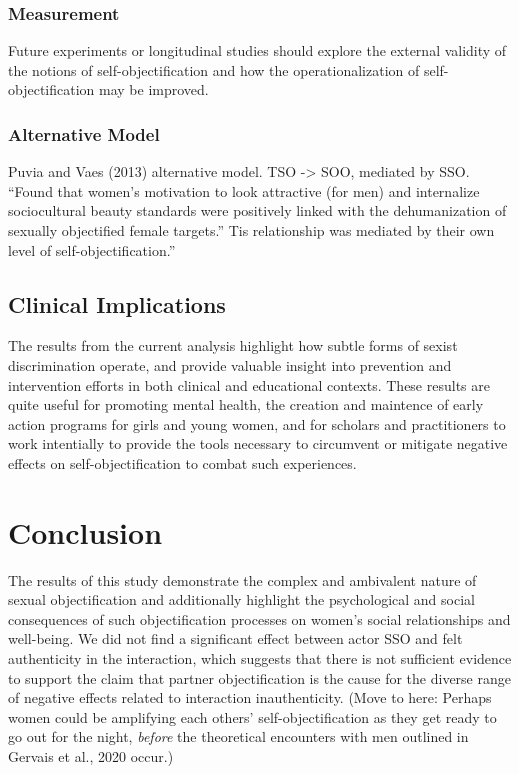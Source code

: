 \documentclass[man]{apa6}
\begin{document}
\subsubsection{Measurement}\label{measurement}

Future experiments or longitudinal studies should explore the external
validity of the notions of self-objectification and how the
operationalization of self-objectification may be improved.

\subsubsection{Alternative Model}\label{alternative-model}

Puvia and Vaes (2013) alternative model. TSO -\textgreater{} SOO,
mediated by SSO. \enquote{Found that women's motivation to look
attractive (for men) and internalize sociocultural beauty standards were
positively linked with the dehumanization of sexually objectified female
targets.} Tis relationship was mediated by their own level of
self-objectification.''

\subsection{Clinical Implications}\label{clinical-implications}

The results from the current analysis highlight how subtle forms of
sexist discrimination operate, and provide valuable insight into
prevention and intervention efforts in both clinical and educational
contexts. These results are quite useful for promoting mental health,
the creation and maintence of early action programs for girls and young
women, and for scholars and practitioners to work intentially to provide
the tools necessary to circumvent or mitigate negative effects on
self-objectification to combat such experiences.

\section{Conclusion}\label{conclusion}

The results of this study demonstrate the complex and ambivalent nature
of sexual objectification and additionally highlight the psychological
and social consequences of such objectification processes on women's
social relationships and well-being. We did not find a significant
effect between actor SSO and felt authenticity in the interaction, which
suggests that there is not sufficient evidence to support the claim that
partner objectification is the cause for the diverse range of negative
effects related to interaction inauthenticity. (Move to here: Perhaps
women could be amplifying each others' self-objectification as they get
ready to go out for the night, \emph{before} the theoretical encounters
with men outlined in Gervais et al., 2020 occur.)
\end{document}
